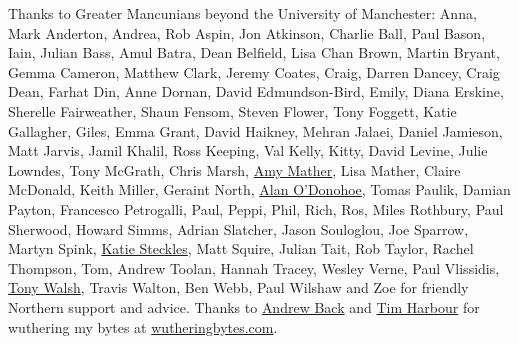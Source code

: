 \documentclass[
]{book}
\begin{document}
Thanks to Greater Mancunians beyond the University of Manchester: Anna, Mark Anderton, Andrea, Rob Aspin, Jon Atkinson, Charlie Ball, Paul Bason, Iain, Julian Bass, Amul Batra, Dean Belfield, Lisa Chan Brown, Martin Bryant, Gemma Cameron, Matthew Clark, Jeremy Coates, Craig, Darren Dancey, Craig Dean, Farhat Din, Anne Dornan, David Edmundson-Bird, Emily, Diana Erskine, Sherelle Fairweather, Shaun Fensom, Steven Flower, Tony Foggett, Katie Gallagher, Giles, Emma Grant, David Haikney, Mehran Jalaei, Daniel Jamieson, Matt Jarvis, Jamil Khalil, Ross Keeping, Val Kelly, Kitty, David Levine, Julie Lowndes, Tony McGrath, Chris Marsh, \href{https://twitter.com/MiniGirlGeek}{Amy Mather}, Lisa Mather, Claire McDonald, Keith Miller, Geraint North, \href{https://twitter.com/teknoteacher}{Alan O'Donohoe}, Tomas Paulik, Damian Payton, Francesco Petrogalli, Paul, Peppi, Phil, Rich, Ros, Miles Rothbury, Paul Sherwood, Howard Simms, Adrian Slatcher, Jason Souloglou, Joe Sparrow, Martyn Spink, \href{https://www.katiesteckles.co.uk/}{Katie Steckles}, Matt Squire, Julian Tait, Rob Taylor, Rachel Thompson, Tom, Andrew Toolan, Hannah Tracey, Wesley Verne, Paul Vlissidis, \href{https://en.wikipedia.org/wiki/Tony_Walsh_(poet)}{Tony Walsh}, Travis Walton, Ben Webb, Paul Wilshaw and Zoe for friendly Northern support and advice. Thanks to \href{https://twitter.com/9600}{Andrew Back} and \href{https://twitter.com/timharbour}{Tim Harbour} for wuthering my bytes at \href{https://wutheringbytes.com/}{wutheringbytes.com}.
\end{document}
